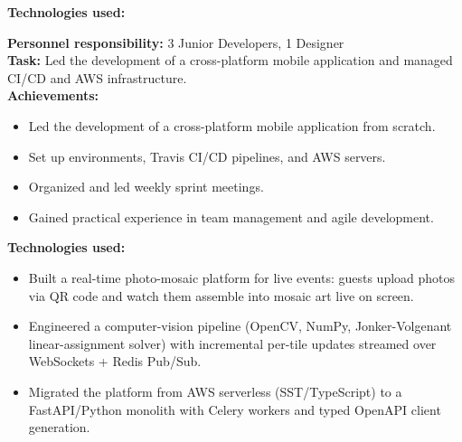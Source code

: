\documentclass[10pt,a4paper,normalphoto]{altacv}
\begin{document}
\begin{fullwidth}
\textbf{Technologies used:}\\[0.4em]

\vspace{2em}

\textbf{Personnel responsibility:} 3 Junior Developers, 1 Designer\\
\textbf{Task:} Led the development of a cross-platform mobile application and managed CI/CD and AWS infrastructure.\\
\textbf{Achievements:}
\begin{itemize}
    \item Led the development of a cross-platform mobile application from scratch.
    \item Set up environments, Travis CI/CD pipelines, and AWS servers.
    \item Organized and led weekly sprint meetings.
    \item Gained practical experience in team management and agile development.
\end{itemize}

\textbf{Technologies used:}\\[0.4em]

\vspace{2em}

\newpage
{}

\begin{itemize}
    \item Built a real-time photo-mosaic platform for live events: guests upload photos via QR code and watch them assemble into mosaic art live on screen.
    \item Engineered a computer-vision pipeline (OpenCV, NumPy, Jonker-Volgenant linear-assignment solver) with incremental per-tile updates streamed over WebSockets + Redis Pub/Sub.
    \item Migrated the platform from AWS serverless (SST/TypeScript) to a FastAPI/Python monolith with Celery workers and typed OpenAPI client generation.
\end{itemize}


\end{fullwidth}
\end{document}
